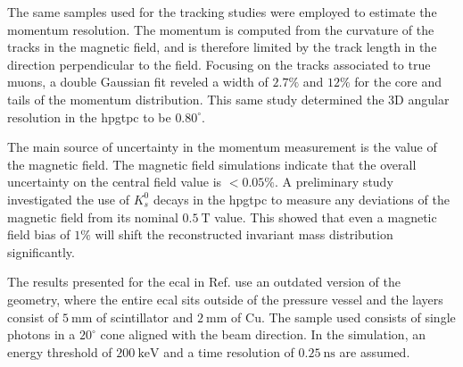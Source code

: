The same samples used for the tracking studies were employed to estimate the momentum resolution. The momentum is computed from the curvature of the tracks in the magnetic field, and is therefore limited by the track length in the direction perpendicular to the field. Focusing on the tracks associated to true muons, a double Gaussian fit reveled a width of $2.7\%$ and $12\%$ for the core and tails of the momentum distribution. This same study determined the 3D angular resolution in the \gls{hpgtpc} to be $0.80^{\circ}$.

The main source of uncertainty in the momentum measurement is the value of the magnetic field. The magnetic field simulations indicate that the overall uncertainty on the central field value is $< 0.05 \%$. A preliminary study investigated the use of $K_{s}^{0}$ decays in the \gls{hpgtpc} to measure any deviations of the magnetic field from its nominal $0.5 ~ \mathrm{T}$ value. This showed that even a magnetic field bias of $1\%$ will shift the reconstructed invariant mass distribution significantly.

The results presented for the \gls{ecal} in Ref. \cite{DUNE2021NDCDR} use an outdated version of the geometry, where the entire \gls{ecal} sits outside of the pressure vessel and the layers consist of $5~\mathrm{mm}$ of scintillator and $2~\mathrm{mm}$ of Cu. The sample used consists of single photons in a $20^{\circ}$ cone aligned with the beam direction. In the simulation, an energy threshold of $200~\mathrm{keV}$ and a time resolution of $0.25~\mathrm{ns}$ are assumed.

